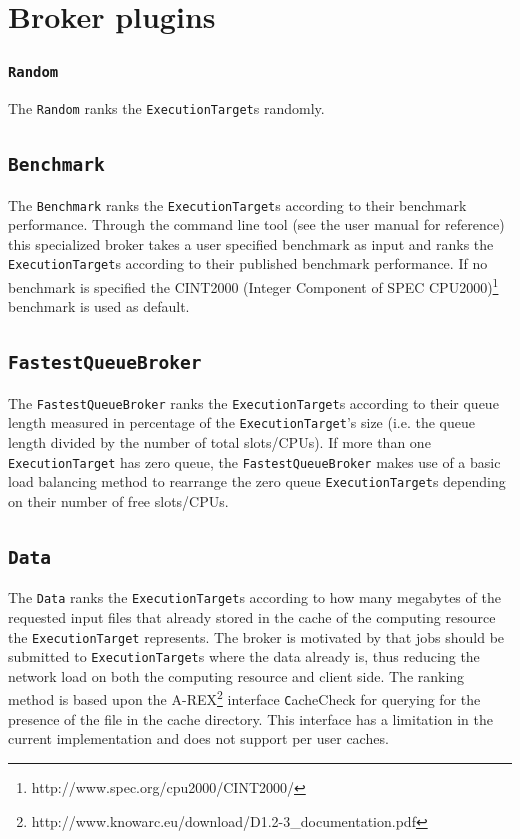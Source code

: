\documentclass{book}
\newcommand{\Random}{\texttt{Random}}
\newcommand{\Benchmark}{\texttt{Benchmark}}
\newcommand{\FastestQueueBroker}{\texttt{FastestQueueBroker}}
\newcommand{\Data}{\texttt{Data}}
\newcommand{\ExecutionTarget}{\texttt{ExecutionTarget}}
\begin{document}
\section{Broker plugins}
\label{sec:brokerplugins}

\subsubsection{\Random}

The {\Random} ranks the {\ExecutionTarget}s randomly.

\subsection{\Benchmark}

The {\Benchmark} ranks the {\ExecutionTarget}s according to their
benchmark performance. Through the command line tool (see the user
manual\cite{ui} for reference) this specialized broker takes a user
specified benchmark as input and ranks the {\ExecutionTarget}s
according to their published benchmark performance. If no benchmark is
specified the CINT2000 (Integer Component of SPEC
CPU2000)\footnote{http://www.spec.org/cpu2000/CINT2000/} benchmark is
used as default.

\subsection{\FastestQueueBroker}

The {\FastestQueueBroker} ranks the {\ExecutionTarget}s according to
their queue length measured in percentage of the {\ExecutionTarget}'s
size (i.e. the queue length divided by the number of total
slots/CPUs). If more than one {\ExecutionTarget} has zero queue, the
{\FastestQueueBroker} makes use of a basic load balancing method to
rearrange the zero queue {\ExecutionTarget}s depending on their number
of free slots/CPUs.

\subsection{\Data}

The {\Data} ranks the {\ExecutionTarget}s according to how many
megabytes of the requested input files that already stored in the
cache of the computing resource the {\ExecutionTarget} represents. The
broker is motivated by that jobs should be submitted to
{\ExecutionTarget}s where the data already is, thus reducing the
network load on both the computing resource and client side. The
ranking method is based upon the
A-REX\footnote{http://www.knowarc.eu/download/D1.2-3\_documentation.pdf}
interface {\texttt CacheCheck} for querying for the presence of the
file in the cache directory. This interface has a limitation in the
current implementation and does not support per user caches.
\end{document}
